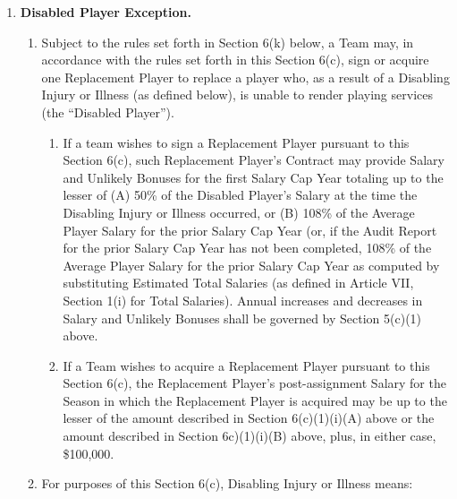 \documentclass[
]{book}
\providecommand{\tightlist}{%
  \setlength{\itemsep}{0pt}\setlength{\parskip}{0pt}}
\begin{document}
\begin{enumerate}
\def\labelenumi{(\alph{enumi})}
\setcounter{enumi}{2}
\tightlist
\item
  \textbf{Disabled Player Exception.}

  \begin{enumerate}
  \def\labelenumii{(\arabic{enumii})}
  \tightlist
  \item
    Subject to the rules set forth in Section 6(k) below, a Team may, in accordance with the rules set forth in this Section 6(c), sign or acquire one Replacement Player to replace a player who, as a result of a Disabling Injury or Illness (as defined below), is unable to render playing services (the ``Disabled Player'').

    \begin{enumerate}
    \def\labelenumiii{(\roman{enumiii})}
    \tightlist
    \item
      If a team wishes to sign a Replacement Player pursuant to this Section 6(c), such Replacement Player's Contract may provide Salary and Unlikely Bonuses for the first Salary Cap Year totaling up to the lesser of (A) 50\% of the Disabled Player's Salary at the time the Disabling Injury or Illness occurred, or (B) 108\% of the Average Player Salary for the prior Salary Cap Year (or, if the Audit Report for the prior Salary Cap Year has not been completed, 108\% of the Average Player Salary for the prior Salary Cap Year as computed by substituting Estimated Total Salaries (as defined in Article VII, Section 1(i) for Total Salaries). Annual increases and decreases in Salary and Unlikely Bonuses shall be governed by Section 5(c)(1) above.
    \item
      If a Team wishes to acquire a Replacement Player pursuant to this Section 6(c), the Replacement Player's post-assignment Salary for the Season in which the Replacement Player is acquired may be up to the lesser of the amount described in Section 6(c)(1)(i)(A) above or the amount described in Section 6c)(1)(i)(B) above, plus, in either case, \$100,000.
    \end{enumerate}
  \item
    For purposes of this Section 6(c), Disabling Injury or Illness means:


\end{enumerate}
\end{enumerate}
\end{document}
